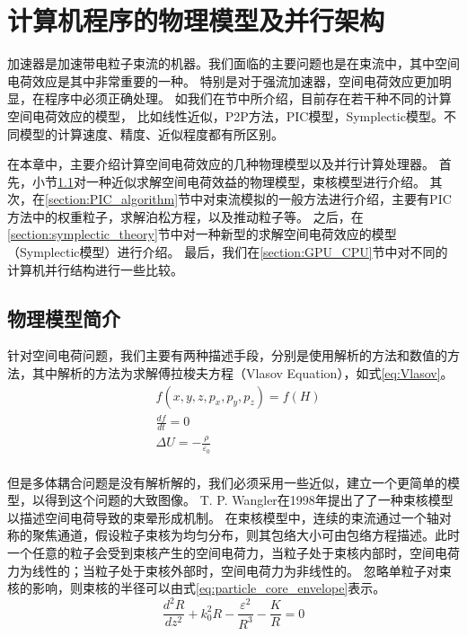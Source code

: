 
\chapter{计算机程序的物理模型及并行架构}
\label{chap:Algorithm}
加速器是加速带电粒子束流的机器。我们面临的主要问题也是在束流中，其中空间电荷效应是其中非常重要的一种。
特别是对于强流加速器，空间电荷效应更加明显，在程序中必须正确处理。
如我们在\label{section:spaceChargeIntro}节中所介绍，目前存在若干种不同的计算空间电荷效应的模型，
比如线性近似，P2P方法，PIC模型，Symplectic模型。不同模型的计算速度、精度、近似程度都有所区别。

在本章中，主要介绍计算空间电荷效应的几种物理模型以及并行计算处理器。
首先，小节\ref{section:particle_core}对一种近似求解空间电荷效益的物理模型，束核模型进行介绍。
其次，在\ref{section:PIC_algorithm}节中对束流模拟的一般方法进行介绍，主要有PIC方法中的权重粒子，求解泊松方程，以及推动粒子等。
之后，在\ref{section:symplectic_theory}节中对一种新型的求解空间电荷效应的模型（Symplectic模型）进行介绍。
最后，我们在\ref{section:GPU_CPU}节中对不同的计算机并行结构进行一些比较。

\section{物理模型简介}            \label{section:particle_core}
针对空间电荷问题，我们主要有两种描述手段，分别是使用解析的方法和数值的方法，其中解析的方法为求解傅拉梭夫方程（Vlasov Equation），如式\ref{eq:Vlasov}。
\begin{equation}
    \label{eq:Vlasov}
    \begin{aligned}
        & f(x,y,z,{{p}_{x}},{{p}_{y}},{{p}_{z}})=f(H) \\
        & \frac{df}{dt}=0 \\
        & \Delta U=-\frac{\rho }{{{\varepsilon }_{0}}} \\
    \end{aligned}
\end{equation}

但是多体耦合问题是没有解析解的，我们必须采用一些近似，建立一个更简单的模型，以得到这个问题的大致图像。
T. P. Wangler在1998年提出了了一种束核模型\cite{wangler1998particle}以描述空间电荷导致的束晕形成机制。
在束核模型中，连续的束流通过一个轴对称的聚焦通道，假设粒子束核为均匀分布，则其包络大小可由包络方程描述。此时一个任意的粒子会受到束核产生的空间电荷力，当粒子处于束核内部时，空间电荷力为线性的；当粒子处于束核外部时，空间电荷力为非线性的。
忽略单粒子对束核的影响，则束核的半径可以由式\ref{eq:particle_core_envelope}表示。
\begin{equation}
    \label{eq:particle_core_envelope}
    \frac{{{d}^{2}}R}{d{{z}^{2}}}+k_{0}^{2}R-\frac{{{\varepsilon }^{2}}}{{{R}^{3}}}-\frac{K}{R}=0
\end{equation}

